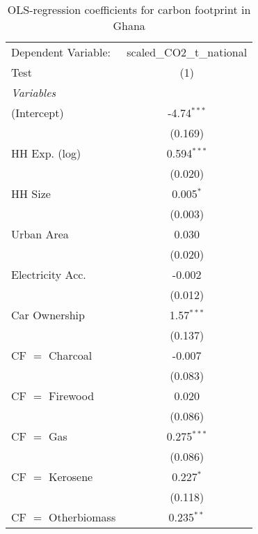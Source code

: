 
\begin{table}[htbp!]
   \centering
   \small
   \begin{adjustbox}{width = 1\textwidth, max height = 0.95\textheight, center}
      \begin{threeparttable}[b]
         \caption{\label{tab:OLS_2_GHA} OLS-regression coefficients for carbon footprint in Ghana}
         \begin{tabular}{lc}
            \tabularnewline \midrule \midrule
            Dependent Variable: & scaled\_CO2\_t\_national\\     
            Test                & (1)\\  
            \midrule
            \emph{Variables}\\
            (Intercept)         & -4.74$^{***}$\\   
                                & (0.169)\\   
            HH Exp. (log)       & 0.594$^{***}$\\   
                                & (0.020)\\   
            HH Size             & 0.005$^{*}$\\   
                                & (0.003)\\   
            Urban Area          & 0.030\\   
                                & (0.020)\\   
            Electricity Acc.    & -0.002\\   
                                & (0.012)\\   
            Car Ownership       & 1.57$^{***}$\\   
                                & (0.137)\\   
            CF $=$ Charcoal     & -0.007\\   
                                & (0.083)\\   
            CF $=$ Firewood     & 0.020\\   
                                & (0.086)\\   
            CF $=$ Gas          & 0.275$^{***}$\\   
                                & (0.086)\\   
            CF $=$ Kerosene     & 0.227$^{*}$\\   
                                & (0.118)\\   
            CF $=$ Otherbiomass & 0.235$^{**}$\\   

\end{tabular}
\end{threeparttable}
\end{adjustbox}
\end{table}

